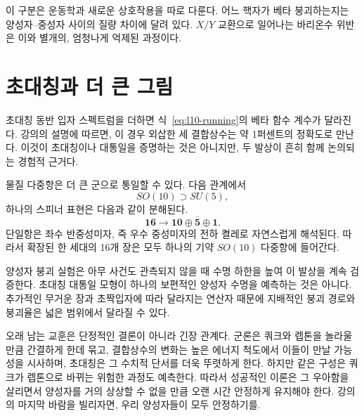 이 구분은 운동학과 새로운 상호작용을 따로 다룬다. 어느 핵자가 베타 붕괴하는지는 양성자--중성자 사이의 질량 차이에 달려 있다. \(X/Y\) 교환으로 일어나는 바리온수 위반은 이와 별개의, 엄청나게 억제된 과정이다.

\section{초대칭과 더 큰 그림}

초대칭 동반 입자 스펙트럼을 더하면 식~\eqref{eq:l10-running}의 베타 함수 계수가 달라진다. 강의의 설명에 따르면, 이 경우 외삽한 세 결합상수는 약 1퍼센트의 정확도로 만난다. 이것이 초대칭이나 대통일을 증명하는 것은 아니지만, 두 발상이 흔히 함께 논의되는 경험적 근거다.

물질 다중항은 더 큰 군으로 통일할 수 있다. 다음 관계에서
\begin{equation}
SO(10)\supset SU(5),
\end{equation}
하나의 스피너 표현은 다음과 같이 분해된다.
\begin{equation}
\mathbf{16}
\longrightarrow
\mathbf{10}\oplus\overline{\mathbf5}\oplus\mathbf1.
\label{eq:l10-so10}
\end{equation}
단일항은 좌수 반중성미자, 즉 우수 중성미자의 전하 켤레로 자연스럽게 해석된다. 따라서 확장된 한 세대의 16개 장은 모두 하나의 기약 \(SO(10)\) 다중항에 들어간다.

양성자 붕괴 실험은 아무 사건도 관측되지 않을 때 수명 하한을 높여 이 발상을 계속 검증한다. 초대칭 대통일 모형이 하나의 보편적인 양성자 수명을 예측하는 것은 아니다. 추가적인 무거운 장과 초짝입자에 따라 달라지는 연산자 때문에 지배적인 붕괴 경로와 붕괴율은 넓은 범위에서 달라질 수 있다.


오래 남는 교훈은 단정적인 결론이 아니라 긴장 관계다. 군론은 쿼크와 렙톤을 놀라울 만큼 간결하게 한데 묶고, 결합상수의 변화는 높은 에너지 척도에서 이들이 만날 가능성을 시사하며, 초대칭은 그 수치적 단서를 더욱 뚜렷하게 한다. 하지만 같은 구성은 쿼크가 렙톤으로 바뀌는 위험한 과정도 예측한다. 따라서 성공적인 이론은 그 우아함을 살리면서 양성자를 거의 상상할 수 없을 만큼 오랜 시간 안정하게 유지해야 한다. 강의의 마지막 바람을 빌리자면, 우리 양성자들이 모두 안정하기를.